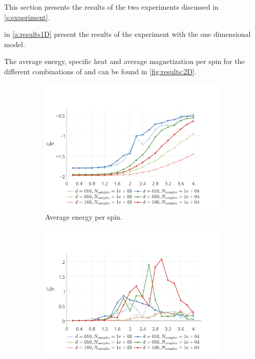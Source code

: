 This section presents the results of the two experiments discussed in \cref{s:experiment}.

 in \cref{a:results1D} present the results of the experiment with the one dimensional model.

The average energy, specific heat and average magnetization per spin for the different combinations of \numberOfSpins and \numberOfSamples can be found in \cref{fig:results:2D}. 

\begin{figure}
	\centering
	\begin{subfigure}{\columnwidth}
		\centering
		\includegraphics[width=\textwidth]{./img/2D/averageEnergy}
		\caption{Average energy per spin.}
		\label{fig:results:2D:averageEnergy}
	\end{subfigure}
	\begin{subfigure}{\columnwidth}
		\centering
		\includegraphics[width=\textwidth]{./img/2D/specificHeat}

\end{subfigure}
\end{figure}
